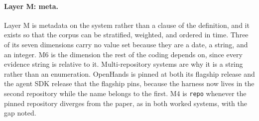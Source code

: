 \paragraph{Layer M: meta.}\label{subsec:layer-m}
Layer M is metadata on the system rather than a clause of the definition, and it exists so that the
corpus can be stratified, weighted, and ordered in time. Three of its seven dimensions carry no value set
because they are a date, a string, and an integer. M6 is the dimension the rest of the coding depends on,
since every evidence string is relative to it. Multi-repository systems are why it is a string rather
than an enumeration. OpenHands is pinned at both its flagship release and the agent SDK release that the
flagship pins, because the harness now lives in the second repository while the name belongs to the
first. M4 is \texttt{repo} whenever the pinned repository diverges from the paper, as in both worked
systems, with the gap noted.


